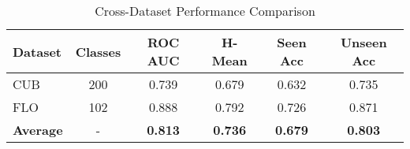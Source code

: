 
\begin{table}[htbp]
\centering
\caption{Cross-Dataset Performance Comparison}
\label{tab:cross_dataset}
\begin{tabular}{|l|c|c|c|c|c|}
\hline
\textbf{Dataset} & \textbf{Classes} & \textbf{ROC AUC} & \textbf{H-Mean} & \textbf{Seen Acc} & \textbf{Unseen Acc} \\
\hline
CUB & 200 & 0.739 & 0.679 & 0.632 & 0.735 \\
FLO & 102 & 0.888 & 0.792 & 0.726 & 0.871 \\
\hline
\textbf{Average} & - & \textbf{0.813} & \textbf{0.736} & \textbf{0.679} & \textbf{0.803} \\
\hline
\end{tabular}
\end{table}
